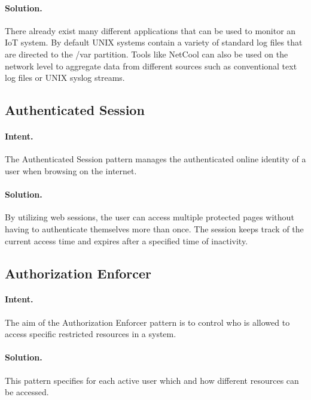 \paragraph{\textbf{Solution.}} There already exist many different applications that can be used to monitor an IoT system. By default UNIX systems contain a variety of standard log files that are directed to the /var partition. Tools like NetCool can also be used on the network level to aggregate data from different sources such as conventional text log files or UNIX syslog streams. 


\subsection{Authenticated Session~\cite{Papoutsakis2021}} 
\label{p:acs}

\paragraph{\textbf{Intent.}} The Authenticated Session pattern manages the authenticated online identity of a user when browsing on the internet.

\paragraph{\textbf{Solution.}} By utilizing web sessions, the user can access multiple protected pages without having to authenticate themselves more than once. The session keeps track of the current access time and expires after a specified time of inactivity.


\subsection{Authorization Enforcer~\cite{Papoutsakis2021}} 
\label{p:aze}

\paragraph{\textbf{Intent.}} The aim of the Authorization Enforcer pattern is to control who is allowed to access specific restricted resources in a system.

\paragraph{\textbf{Solution.}} This pattern specifies for each active user which and how different resources can be accessed. 


